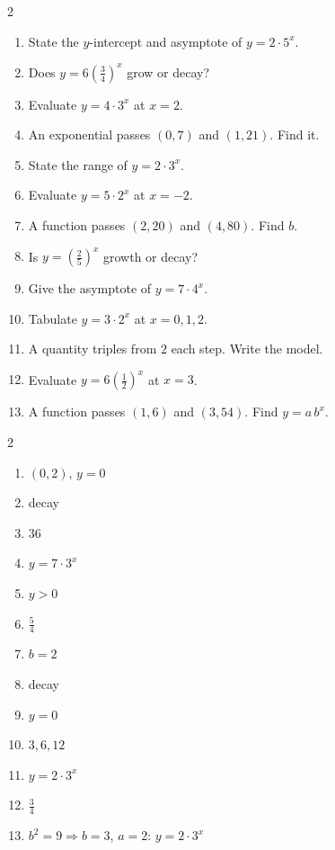 \documentclass[11pt]{article}
\begin{document}
\begin{recapbox}
\begin{multicols}{2}
\small
\begin{enumerate}[leftmargin=*,itemsep=3pt]
  \item State the $y$-intercept and asymptote of $y=2\cdot5^{x}$.
  \item Does $y=6\left(\tfrac34\right)^{x}$ grow or decay?
  \item Evaluate $y=4\cdot3^{x}$ at $x=2$.
  \item An exponential passes $(0,7)$ and $(1,21)$. Find it.
  \item State the range of $y=2\cdot3^{x}$.
  \item Evaluate $y=5\cdot2^{x}$ at $x=-2$.
  \item A function passes $(2,20)$ and $(4,80)$. Find $b$.
  \item Is $y=\left(\tfrac25\right)^{x}$ growth or decay?
  \item Give the asymptote of $y=7\cdot4^{x}$.
  \item Tabulate $y=3\cdot2^{x}$ at $x=0,1,2$.
  \item A quantity triples from $2$ each step. Write the model.
  \item Evaluate $y=6\left(\tfrac12\right)^{x}$ at $x=3$.
  \item A function passes $(1,6)$ and $(3,54)$. Find $y=a\,b^{x}$.
\end{enumerate}
\end{multicols}
\end{recapbox}

\begin{keybox}
\begin{multicols}{2}
\small
\begin{enumerate}[leftmargin=*,itemsep=3pt]
  \item $(0,2)$, $y=0$
  \item decay
  \item $36$
  \item $y=7\cdot3^{x}$
  \item $y>0$
  \item $\tfrac54$
  \item $b=2$
  \item decay
  \item $y=0$
  \item $3,6,12$
  \item $y=2\cdot3^{x}$
  \item $\tfrac34$
  \item $b^2=9\Rightarrow b=3$, $a=2$: $y=2\cdot3^{x}$
\end{enumerate}
\end{multicols}
\end{keybox}
\end{document}
